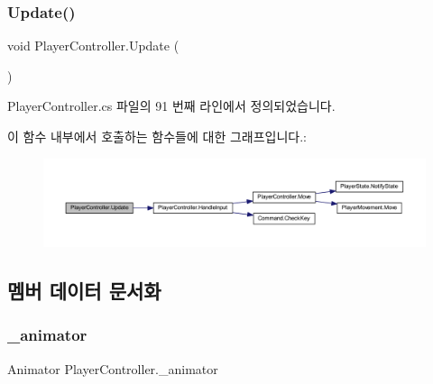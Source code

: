 \subsubsection{\texorpdfstring{Update()}{Update()}}
{\footnotesize\ttfamily void Player\+Controller.\+Update (\begin{DoxyParamCaption}{ }\end{DoxyParamCaption})\hspace{0.3cm}{\ttfamily [private]}}



Player\+Controller.\+cs 파일의 91 번째 라인에서 정의되었습니다.


\begin{DoxyCode}{0}

\end{DoxyCode}
이 함수 내부에서 호출하는 함수들에 대한 그래프입니다.\+:\nopagebreak
\begin{figure}[H]
\begin{center}
\leavevmode
\includegraphics[width=350pt]{dc/dde/class_player_controller_ae8bc83dffb99867a04be016473ed2c43_cgraph}
\end{center}
\end{figure}


\subsection{멤버 데이터 문서화}
\mbox{\label{class_player_controller_ada29d77d333483963257e51a6e15b8ae}} 
\subsubsection{\texorpdfstring{\_animator}{\_animator}}
{\footnotesize\ttfamily Animator Player\+Controller.\+\_\+animator\hspace{0.3cm}{\ttfamily [private]}}



